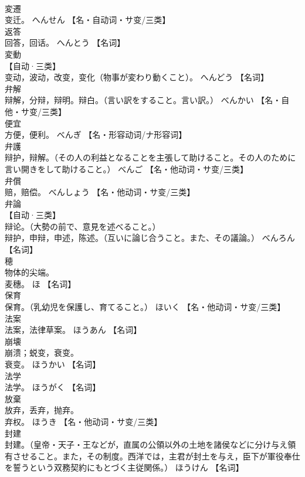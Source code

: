 \documentclass[8pt]{extreport}
\begin{document}
\begin{CJK}{UTF8}{min}
\\	変遷	
\\	变迁。	へんせん		【名・自动词・サ变/三类】
\\	返答	
\\	回答，回话。	へんとう		【名词】
\\	変動	
\\	【自动·三类】 
\\	变动，波动，改变，变化（物事が変わり動くこと）。	へんどう		【名词】
\\	弁解	
\\	辩解，分辩，辩明。辩白。（言い訳をすること。言い訳。）	べんかい		【名・自他・サ变/三类】
\\	便宜	
\\	方便，便利。	べんぎ		【名・形容动词/ナ形容词】
\\	弁護	
\\	辩护，辩解。（その人の利益となることを主張して助けること。その人のために言い開きをして助けること。）	べんご		【名・他动词・サ变/三类】
\\	弁償	
\\	赔，赔偿。	べんしょう		【名・他动词・サ变/三类】
\\	弁論	
\\	【自动·三类】 
\\	辩论。（大勢の前で、意見を述べること。） 
\\	辩护，申辩，申述，陈述。（互いに論じ合うこと。また、その議論。）	べんろん		【名词】
\\	穂	
\\	物体的尖端。 
\\	麦穗。	ほ		【名词】
\\	保育	
\\	保育。（乳幼児を保護し、育てること。）	ほいく		【名・他动词・サ变/三类】
\\	法案	
\\	法案，法律草案。	ほうあん		【名词】
\\	崩壊	
\\	崩溃；蜕变，衰变。 
\\	衰变。	ほうかい		【名词】
\\	法学	
\\	法学。	ほうがく		【名词】
\\	放棄	
\\	放弃，丢弃，抛弃。 
\\	弃权。	ほうき		【名・他动词・サ变/三类】
\\	封建	
\\	封建。（皇帝・天子・王などが，直属の公領以外の土地を諸侯などに分け与え領有させること。また，その制度。西洋では，主君が封土を与え，臣下が軍役奉仕を誓うという双務契約にもとづく主従関係。）	ほうけん		【名词】

\end{CJK}
\end{document}
